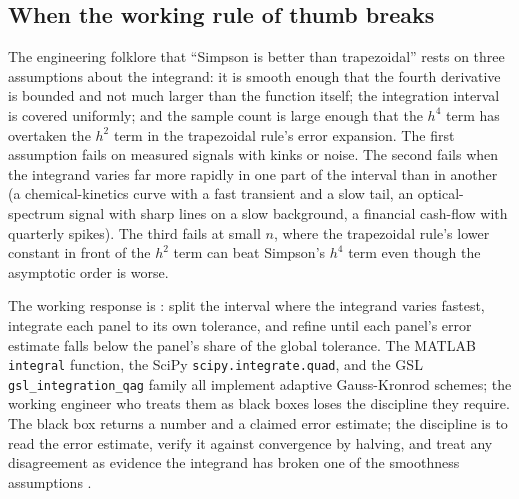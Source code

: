 \subsection{When the working rule of thumb breaks}

The engineering folklore that ``Simpson is better than
trapezoidal'' rests on three assumptions about the integrand: it
is smooth enough that the fourth derivative is bounded and not
much larger than the function itself; the integration interval is
covered uniformly; and the sample count is large enough that the
$h^{4}$ term has overtaken the $h^{2}$ term in the trapezoidal
rule's error expansion. The first assumption fails on measured
signals with kinks or noise. The second fails when the integrand
varies far more rapidly in one part of the interval than in
another (a chemical-kinetics curve with a fast transient and a
slow tail, an optical-spectrum signal with sharp lines on a slow
background, a financial cash-flow with quarterly spikes). The
third fails at small $n$, where the trapezoidal rule's lower
constant in front of the $h^{2}$ term can beat Simpson's
$h^{4}$ term even though the asymptotic order is worse.

The working response is : split the
interval where the integrand varies fastest, integrate each panel
to its own tolerance, and refine until each panel's error
estimate falls below the panel's share of the global tolerance.
The MATLAB \texttt{integral} function, the SciPy
\texttt{scipy.integrate.quad}, and the GSL
\texttt{gsl\_integration\_qag} family all implement adaptive
Gauss-Kronrod schemes; the working engineer who treats them as
black boxes loses the discipline they require. The black box
returns a number and a claimed error estimate; the discipline is
to read the error estimate, verify it against convergence by
halving, and treat any disagreement as evidence the integrand has
broken one of the smoothness assumptions
\cite{text:v2ch06-burden-faires-numerical}.

